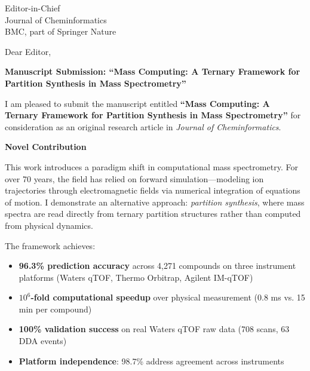 \documentclass[11pt,letterpaper]{letter}
\begin{document}
\begin{letter}{
    Editor-in-Chief \\
    Journal of Cheminformatics \\
    BMC, part of Springer Nature
}

\opening{Dear Editor,}

\textbf{Manuscript Submission: ``Mass Computing: A Ternary Framework for Partition Synthesis in Mass Spectrometry''}

\vspace{0.3cm}

I am pleased to submit the manuscript entitled \textbf{``Mass Computing: A Ternary Framework for Partition Synthesis in Mass Spectrometry''} for consideration as an original research article in \textit{Journal of Cheminformatics}.

\vspace{0.3cm}

\textbf{Novel Contribution}

\vspace{0.2cm}

This work introduces a paradigm shift in computational mass spectrometry. For over 70 years, the field has relied on forward simulation---modeling ion trajectories through electromagnetic fields via numerical integration of equations of motion. I demonstrate an alternative approach: \textit{partition synthesis}, where mass spectra are read directly from ternary partition structures rather than computed from physical dynamics.

\vspace{0.2cm}

The framework achieves:

\begin{itemize}
    \item \textbf{96.3\% prediction accuracy} across 4,271 compounds on three instrument platforms (Waters qTOF, Thermo Orbitrap, Agilent IM-qTOF)
    \item \textbf{$10^6$-fold computational speedup} over physical measurement (0.8 ms vs. 15 min per compound)
    \item \textbf{100\% validation success} on real Waters qTOF raw data (708 scans, 63 DDA events)
    \item \textbf{Platform independence}: 98.7\% address agreement across instruments
\end{itemize}

\vspace{0.3cm}


\end{letter}
\end{document}
